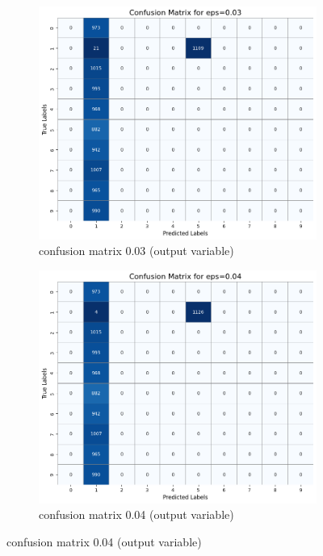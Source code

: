 \documentclass[11pt,onside]{article}
\begin{document}
\begin{figure}[h]
  \centering
  \begin{subfigure}[b]{0.49\textwidth}
    \centering
    \includegraphics[width=\textwidth]{V2_images/_correct_labels_confusion_matrix_eps_0.03.png}
    \caption{confusion matrix 0.03 (output variable)}
    \label{fig:image1}
  \end{subfigure}
  \hfill
  \begin{subfigure}[b]{0.49\textwidth}
    \centering
    \includegraphics[width=\textwidth]{V2_images/_correct_labels_confusion_matrix_eps_0.04.png}
    \caption{confusion matrix 0.04 (output variable)}
    \label{fig:image2}
  \end{subfigure}

  \label{fig:images}
\end{figure}
\end{document}
